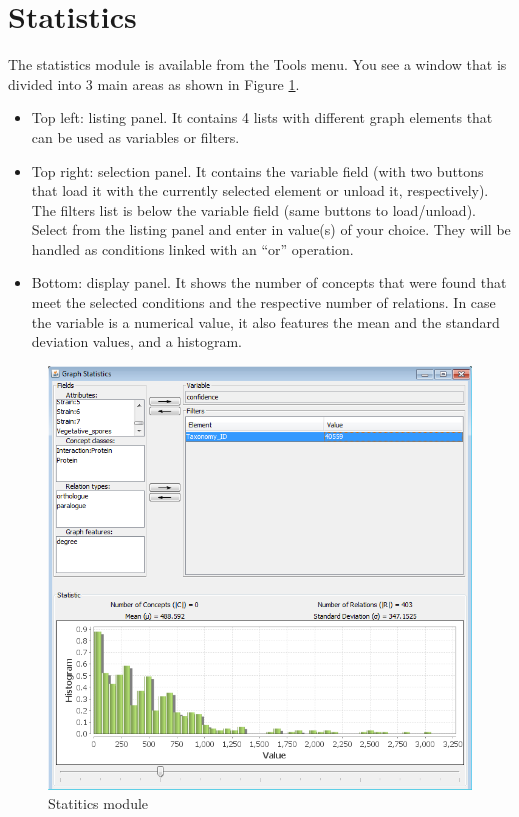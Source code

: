 \section{Statistics}
\label{sec:ref_stats}
The statistics module is available from the Tools menu.
You see a window that is divided into 3 main areas as shown in Figure \ref{fig:stats}.
\begin{itemize}
\item Top left: listing panel.
It contains 4 lists with different graph elements that can be used as variables or filters.
\item Top right: selection panel.
It contains the variable field (with two buttons that load it with the currently selected element or unload it, respectively).
The filters list is below the variable field (same buttons to load/unload).
Select from the listing panel and enter in value(s) of your choice.
They will be handled as conditions linked with an ``or'' operation.
\item Bottom: display panel.
It shows the number of concepts that were found that meet the selected conditions and the respective number of relations.
In case the variable is a numerical value, it also features the mean and the standard deviation values, and a histogram.
\end{itemize}

\begin{figure}[H]
\centering
\includegraphics[scale=0.6]{images/Oct12/stats.png} 
\caption{Statitics module}
\label{fig:stats}
\end{figure}

